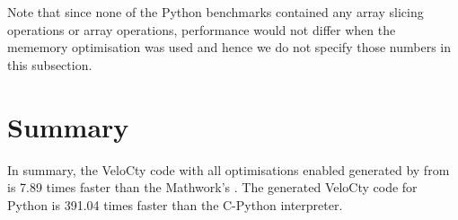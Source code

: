Note that since none of the Python benchmarks contained any array slicing operations or array operations, performance would not differ when the mememory optimisation was used and hence we do not specify those numbers in this subsection. 
\section{Summary}
In summary, the VeloCty code with all optimisations enabled generated by \velocty from \matlab is 7.89 times faster than the Mathwork's \matlab. The generated VeloCty code for Python is 391.04 times faster than the C-Python interpreter.  
